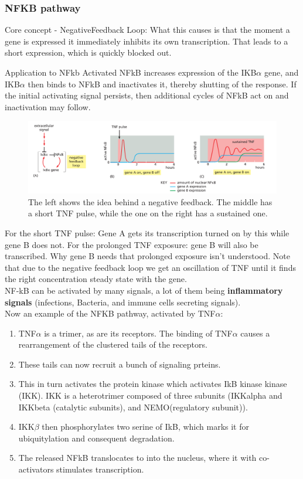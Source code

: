 \documentclass[../main.tex]{subfiles}
\begin{document}
\subsubsection{\gls{NFKB} pathway}

Core concept - \gls{NegativeFeedback} Loop: What this causes is that the moment a gene is expressed it immediately inhibits its own transcription. That leads to a short expression, which is quickly blocked out.

\begin{RemarkWithTitel}{Application to NFkb}
	Activated NFkB increases expression of the IKB$\alpha$ gene, and IKB$\alpha$ then binds to NFkB	and inactivates it, thereby shutting of the response. If the initial activating signal persists, then additional cycles of NFkB act on and inactivation may follow.
\end{RemarkWithTitel}


\begin{figure}[H]
	\centering
	\includegraphics[width=0.7\linewidth]{NF_theo}
	\caption{The left shows the idea behind a negative feedback. The middle has a short TNF pulse, while the one on the right has a sustained one.}
\end{figure}

For the short TNF pulse: Gene A gets its transcription turned on by this while gene B does not. For the prolonged TNF exposure: gene B will also be transcribed. Why gene B needs that prolonged exposure isn't understood. Note that due to the negative feedback loop we get an oscillation of TNF until it finds the right concentration steady state with the gene. \\


NF-kB can be activated by many signals, a lot of them being \textbf{inflammatory signals} (infections, Bacteria, and immune cells secreting signals). \\

Now an example of the \gls{NFKB} pathway, activated by \gls{TNF}$\alpha$:
\begin{enumerate}
	\item TNF$\alpha$ is a trimer, as are its receptors. The binding of TNF$\alpha$ causes a rearrangement of the clustered tails of the receptors.
	\item These tails can now recruit a bunch of signaling prteins.
	\item This in turn activates the protein kinase which activates IkB kinase kinase (IKK). IKK is a heterotrimer composed of three subunits (\gls{IKKalpha} and \gls{IKKbeta} (catalytic subunits), and \gls{NEMO}(regulatory subunit)).
	\item IKK$\beta$ then phosphorylates two serine of IkB, which marks it for ubiquitylation and consequent degradation.
	\item The released NFkB translocates to into the nucleus, where it with co-activators stimulates transcription.
\end{enumerate}
\end{document}
